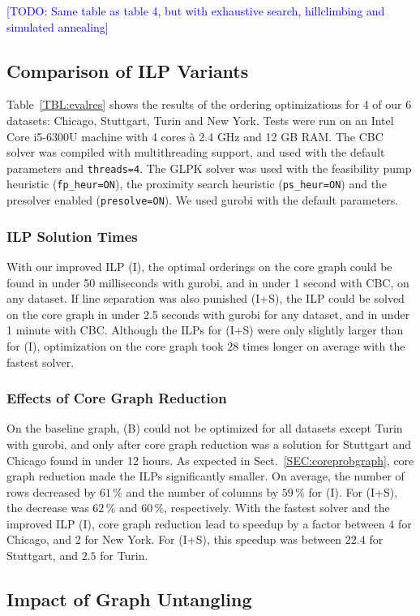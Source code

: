 \documentclass[format=acmsmall, review=false, screen=true]{acmart}
\newcommand\TODO[1]{\textcolor{blue}{\small [TODO: #1]}}
\begin{document}
\TODO{Same table as table 4, but with exhaustive search, hillclimbing and simulated annealing}

\subsection{Comparison of ILP Variants}

Table~\ref{TBL:evalres} shows the results of the ordering optimizations for 4 of our 6 datasets: Chicago, Stuttgart, Turin and New York. Tests were run on an Intel Core i5-6300U machine with 4 cores \`{a} 2.4 GHz and 12 GB RAM.
The CBC solver was compiled with multithreading support, and used with the default parameters and \texttt{threads=4}.
The GLPK solver was used with the feasibility pump heuristic (\texttt{fp\_heur=ON}), the proximity search heuristic (\texttt{ps\_heur=ON}) and the presolver enabled (\texttt{presolve=ON}). We used gurobi with the default parameters.
\subsubsection{ILP Solution Times} With our improved ILP (I), the optimal orderings on the core graph could be found in under 50 milliseconds with gurobi, and in under 1 second with CBC, on any dataset. If line separation was also punished (I+S), the ILP could be solved on the core graph in under 2.5 seconds with gurobi for any dataset, and in under 1 minute with CBC. Although the ILPs for (I+S) were only slightly larger than for (I), optimization on the core graph took $28$ times longer on average with the fastest solver.
\subsubsection{Effects of Core Graph Reduction} On the baseline graph, (B) could not be optimized for all datasets except Turin with gurobi, and only after core graph reduction was a solution for Stuttgart and Chicago found in under 12 hours. As expected in Sect.~\ref{SEC:coreprobgraph}, core graph reduction made the ILPs significantly smaller. On average, the number of rows decreased by $61\,\%$ and the number of columns by $59\,\%$ for (I). For (I+S), the decrease was $62\,\%$ and $60\,\%$, respectively. With the fastest solver and the improved ILP (I), core graph reduction lead to speedup by a factor between $4$ for Chicago, and 2 for New York. For (I+S), this speedup was between $22.4$ for Stuttgart, and $2.5$ for Turin.

\subsection{Impact of Graph Untangling}
\end{document}
